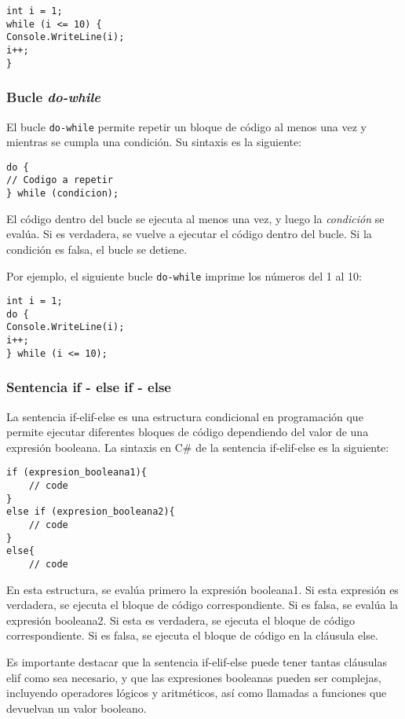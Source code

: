 \documentclass[executivepaper]{article}
\begin{document}
\begin{lstlisting}
int i = 1;
while (i <= 10) {
Console.WriteLine(i);
i++;
}
\end{lstlisting}

\subsubsection*{Bucle \emph{do-while}}

El bucle \verb|do-while| permite repetir un bloque de código al menos una vez y mientras se cumpla una condición. Su sintaxis es la siguiente:

\begin{lstlisting}
do {
// Codigo a repetir
} while (condicion);
\end{lstlisting}

El código dentro del bucle se ejecuta al menos una vez, y luego la \emph{condición} se evalúa. Si es verdadera, se vuelve a ejecutar el código dentro del bucle. Si la condición es falsa, el bucle se detiene.

Por ejemplo, el siguiente bucle \verb|do-while| imprime los números del 1 al 10:

\begin{lstlisting}
int i = 1;
do {
Console.WriteLine(i);
i++;
} while (i <= 10);
\end{lstlisting}

\subsubsection*{Sentencia if - else if - else}
La sentencia if-elif-else es una estructura condicional en programación que permite ejecutar diferentes bloques de código dependiendo del valor de una expresión booleana. La sintaxis en C\# de la sentencia if-elif-else es la siguiente:
\begin{lstlisting}
if (expresion_booleana1){
    // code
}
else if (expresion_booleana2){
    // code
}
else{
    // code
\end{lstlisting}
En esta estructura, se evalúa primero la expresión booleana1. Si esta expresión es verdadera, se ejecuta el bloque de código correspondiente. Si es falsa, se evalúa la expresión booleana2. Si esta es verdadera, se ejecuta el bloque de código correspondiente. Si es falsa, se ejecuta el bloque de código en la cláusula else.

Es importante destacar que la sentencia if-elif-else puede tener tantas cláusulas elif como sea necesario, y que las expresiones booleanas pueden ser complejas, incluyendo operadores lógicos y aritméticos, así como llamadas a funciones que devuelvan un valor booleano.
\end{document}
